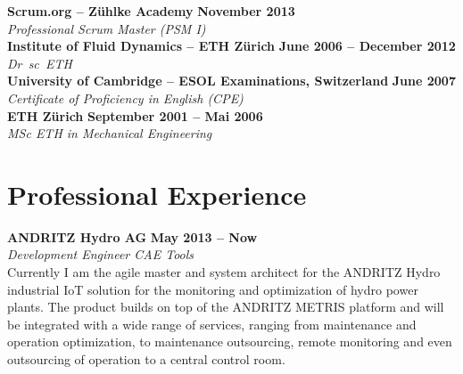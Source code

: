 \documentclass[line,11pt,a4paper]{../resume}
\begin{document}
\begin{resume}
\textbf{Scrum.org -- Z\"uhlke Academy} \hfill \textbf{November 2013}%
\vspace{2mm}\\\vspace{1mm}%
\textsl{Professional Scrum Master (PSM I)}%
\vspace{2mm}\\\vspace{-1mm}%
%
\textbf{Institute of Fluid Dynamics -- ETH Z\"urich} \hfill \textbf{June 2006 -- December 2012}%
\vspace{2mm}\\\vspace{1mm}%
\textsl{Dr\ sc\ ETH}%
\vspace{2mm}\\\vspace{-1mm}%
%
\textbf{University of Cambridge -- ESOL Examinations, Switzerland} \hfill \textbf{June 2007}%
\vspace{2mm}\\\vspace{1mm}%
\textsl{Certificate of Proficiency in English (CPE)}%
\vspace{2mm}\\\vspace{-1mm}%
%
\textbf{ETH Z\"urich} \hfill \textbf{September 2001 -- Mai 2006}%
\vspace{2mm}\\\vspace{1mm}%
\textsl{MSc ETH in Mechanical Engineering}%
\vspace{-3mm}\\\vspace{-1mm}%

\section{\mysidestyle Professional Experience}\vspace{2mm}

\textbf{ANDRITZ Hydro AG} \hfill \textbf{May 2013 -- Now}
\vspace{2mm}\\\vspace{1mm}%
\textsl{Development Engineer CAE Tools}\\
Currently I am the agile master and system architect for the ANDRITZ
Hydro industrial IoT solution for the monitoring and optimization of hydro
power plants. The product builds on top of the ANDRITZ METRIS platform and will
be integrated with a wide range of services, ranging from maintenance and
operation optimization, to maintenance outsourcing, remote monitoring and even
outsourcing of operation to a central control room.


\end{resume}
\end{document}
